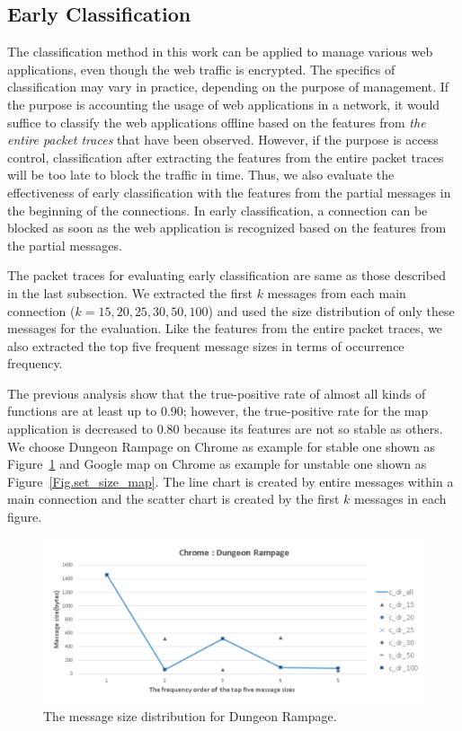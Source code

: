 \subsection{Early Classification}
\label{sec:early}
The classification method in this work can be applied to manage various web applications, even though the web traffic is encrypted. The specifics of classification may vary in practice, depending on the purpose of management. If the purpose is accounting the usage of web applications in a network, it would suffice to classify the web applications offline based on the features from \emph{the entire packet traces} that have been observed. However, if the purpose is access control, classification after extracting the features from the entire packet traces will be too late to block the traffic in time. Thus, we also evaluate the effectiveness of early classification with the features from the partial messages in the beginning of the connections. In early classification, a connection can be blocked as soon as the web application is recognized based on the features from the partial messages. 

The packet traces for evaluating early classification are same as those described in the last subsection. We extracted the first $k$ messages from each main connection ($k=15, 20, 25, 30, 50, 100$) and used the size distribution of only these messages for the evaluation. Like the features from the entire packet traces, we also extracted the top five frequent message sizes in terms of occurrence frequency.  

The previous analysis show that the true-positive rate of almost all kinds of functions are at least up to 0.90; however, the true-positive rate for the map application is decreased to 0.80 because its features are not so stable as others. We choose Dungeon Rampage on Chrome as example for stable one shown as Figure~\ref{Fig.set_size_dr} and Google map on Chrome as example for unstable one shown as Figure~\ref{Fig.set_size_map}. The line chart is created by entire messages within a main connection and the scatter chart is created by the first $k$ messages in each figure.

\begin{figure}[H]
\begin{center} 
\includegraphics[width=1.1\textwidth]{early_dr}
\end{center}
\caption{The message size distribution for Dungeon Rampage.}
\label{Fig.set_size_dr}
\end{figure}

